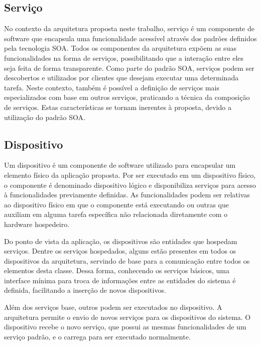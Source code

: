 \subsection{Serviço}

No contexto da arquitetura proposta neste trabalho, serviço é um componente de software que
encapsula uma funcionalidade acessível através dos padrões definidos pela tecnologia \gls{SOA}.
Todos os componentes da arquitetura expõem as suas funcionalidades na forma de serviços,
possibilitando que a interação entre eles seja feita de forma transparente. Como parte do padrão
\gls{SOA}, serviços podem ser descobertos e utilizados por clientes que desejam executar uma
determinada tarefa. Neste contexto, também é possível a definição de serviços mais especializados
com base em outros serviços, praticando a técnica da composição de serviços. Estas características
se tornam inerentes à proposta, devido a utilização do padrão \gls{SOA}.


\subsection{Dispositivo}

Um dispositivo é um componente de software utilizado para encapsular um elemento físico da aplicação
proposta. Por ser executado em um dispositivo físico, o componente é denominado dispositivo lógico e
disponibiliza serviços para acesso à funcionalidades previamente definidas. As funcionalidades podem
ser relativas ao dispositivo físico em que o componente está executando ou outras que auxiliam em
alguma tarefa específica não relacionada diretamente com o hardware hospedeiro.

Do ponto de vista da aplicação, os dispositivos são entidades que hospedam serviços. Dentre os
serviços hospedados, alguns estão presentes em todos os dispositivos da arquitetura, servindo de
base para a comunicação entre todos os elementos desta classe. Dessa forma, conhecendo os serviços
básicos, uma interface mínima para troca de informações entre as entidades do sistema é definida,
facilitando a inserção de novos dispositivos.

Além dos serviços base, outros podem ser executados no dispositivo. A arquitetura permite o envio de
novos serviços para os dispositivos do sistema. O dispositivo recebe o novo serviço, que possui as
mesmas funcionalidades de um serviço padrão, e o carrega para ser executado normalmente.


